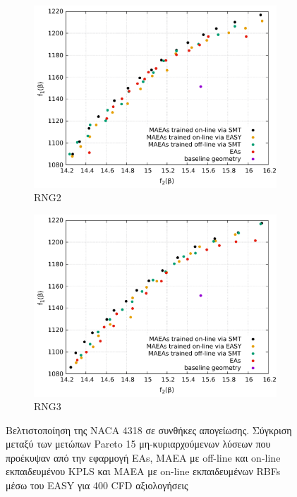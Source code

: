 \documentclass[twoside, 12pt,notitlepage]{report}
\begin{document}
\begin{enumerate}
\begin{figure}[h!]
\centering
\begin{subfigure}[b]{0.45\textwidth}
\centering
\caption{RNG2}
\includegraphics[width=\textwidth]{airfoil_takeoff_MOO_RNG2.pdf}
\end{subfigure}
\hfill
\begin{subfigure}[b]{0.45\textwidth}
\centering
\caption{RNG3}
\includegraphics[width=\textwidth]{airfoil_takeoff_MOO_RNG3.pdf}
\end{subfigure}   
\caption{Βελτιστοποίηση της NACA 4318 σε συνθήκες απογείωσης.
Σύγκριση μεταξύ των μετώπων Pareto 15 μη-κυριαρχούμενων λύσεων
που προέκυψαν από την εφαρμογή EAs, MAEA με off-line και 
on-line εκπαιδευμένου KPLS και MAEA με on-line 
εκπαιδευμένων RBFs μέσω του EASY για 400 CFD αξιολογήσεις} 
\end{figure}


\end{enumerate}
\end{document}
